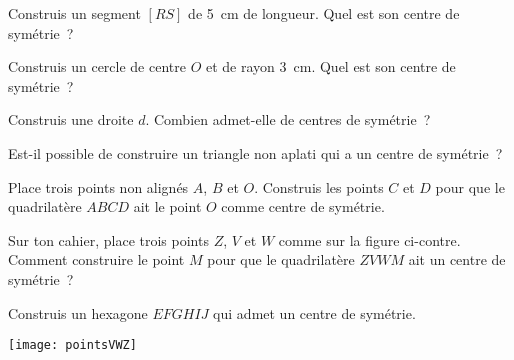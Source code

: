 \begin{activite}

\begin{partie}
Construis un segment $[RS]$ de 5 cm de longueur. Quel est son centre de symétrie ?
\end{partie}


\begin{partie}
Construis un cercle de centre $O$ et de rayon 3 cm. Quel est son centre de symétrie ?
\end{partie}
         
         
\begin{partie}
Construis une droite $d$. Combien admet-elle de centres de symétrie ?
\end{partie}
         
         
\begin{partie}
Est-il possible de construire un triangle non aplati qui a un centre de symétrie ?
\end{partie}
         
         
\begin{partie}
Place trois points non alignés $A$, $B$ et $O$. Construis les points $C$ et $D$ pour que le quadrilatère $ABCD$ ait le point $O$ comme centre de symétrie.
\end{partie}
        
\vspace{1em}

\begin{minipage}[c]{0.62\linewidth}
\begin{partie}
Sur ton cahier, place trois points $Z$, $V$ et $W$ comme sur la figure ci-contre. Comment construire le point $M$ pour que le quadrilatère $ZVWM$ ait un centre de symétrie ?
\end{partie}         
              
         
\begin{partie}
Construis un hexagone $EFGHIJ$ qui admet un centre de symétrie.
\end{partie}
 \end{minipage}
  \qquad \begin{minipage}[c]{0.36\linewidth}
  \texttt{[image: pointsVWZ]}
  \end{minipage} \\

\end{activite}

